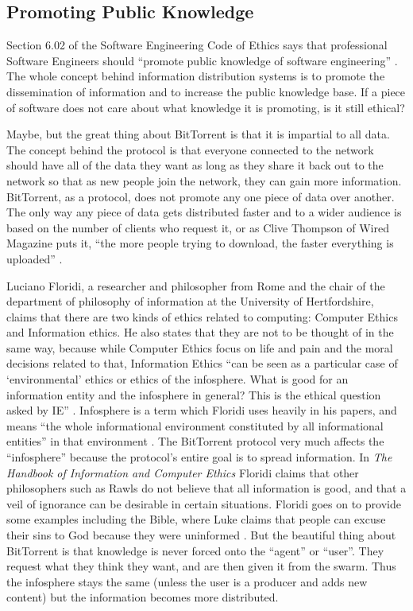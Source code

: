 \documentclass[11pt]{article}
\begin{document}
\subsection{Promoting Public Knowledge}

Section 6.02 of the Software Engineering Code of Ethics says that professional Software Engineers should ``promote public knowledge of software engineering'' \cite[6.02]{secode}. The whole concept behind information distribution systems is to promote the dissemination of information and to increase the public knowledge base. If a piece of software does not care about what knowledge it is promoting, is it still ethical?

Maybe, but the great thing about BitTorrent is that it is impartial to all data. The concept behind the protocol is that everyone connected to the network should have all of the data they want as long as they share it back out to the network so that as new people join the network, they can gain more information. BitTorrent, as a protocol, does not promote any one piece of data over another. The only way any piece of data gets distributed faster and to a wider audience is based on the number of clients who request it, or as Clive Thompson of Wired Magazine puts it, ``the more people trying to download, the faster everything is uploaded'' \cite{wiredbt}.

Luciano Floridi, a researcher and philosopher from Rome and the chair of the department of philosophy of information at the University of Hertfordshire, claims that there are two kinds of ethics related to computing: Computer Ethics and Information ethics. He also states that they are not to be thought of in the same way, because while Computer Ethics focus on life and pain and the moral decisions related to that, Information Ethics ``can be seen as a particular case of `environmental' ethics or ethics of the infosphere. What is good for an information entity and the infosphere in general? This is the ethical question asked by IE'' \cite[1]{floridiInfo}. Infosphere is a term which Floridi uses heavily in his papers, and means ``the whole informational environment constituted by all informational entities'' in that environment \cite[3]{ethicshandbook}. The BitTorrent protocol very much affects the ``infosphere'' because the protocol's entire goal is to spread information. In \textit{The Handbook of Information and Computer Ethics} Floridi claims that other philosophers such as Rawls do not believe that all information is good, and that a veil of ignorance can be desirable in certain situations. Floridi goes on to provide some examples including the Bible, where Luke claims that people can excuse their sins to God because they were uninformed \cite[6]{ethicshandbook}. But the beautiful thing about BitTorrent is that knowledge is never forced onto the ``agent'' or ``user''. They request what they think they want, and are then given it from the swarm. Thus the infosphere stays the same (unless the user is a producer and adds new content) but the information becomes more distributed.
\end{document}
